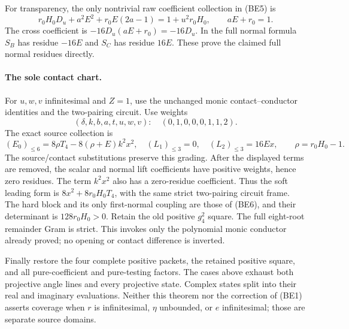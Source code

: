 For transparency, the only nontrivial raw coefficient collection in
(BE5) is
\[
 r_0H_0D_u+a^2E^2+r_0E(2a-1)=1+u^2r_0H_0,
 \qquad aE+r_0=1.
\]
The cross coefficient is $-16D_u(aE+r_0)=-16D_u$.
In the full normal formula $S_B$ has residue $-16E$ and $S_C$ has
residue $16E$. These prove the claimed full normal residues directly.

\paragraph{The sole contact chart.}
For $u,w,v$ infinitesimal and $Z=1$, use the unchanged monic
contact--conductor identities and the two-pairing circuit. Use weights
\[ (\delta,k,b,a,t,u,w,v):\quad(0,1,0,0,0,1,1,2). \]
The exact source collection is
\[
 (E_0)_{\le6}=8\rho T_4-8(\rho+E)k^2x^2,
 \quad (L_1)_{\le3}=0,\quad (L_2)_{\le3}=16Ex,
 \qquad \rho=r_0H_0-1.
\]
The source/contact substitutions preserve this grading. After the
displayed terms are removed, the scalar and normal lift coefficients
have positive weights, hence zero residues. The term $k^2x^2$ also
has a zero-residue coefficient. Thus the soft leading form is
$8x^2+8r_0H_0T_4$, with the same strict two-pairing circuit frame.
The hard block and its only first-normal coupling are those of (BE6),
and their determinant is $128r_0H_0>0$. Retain the old positive
$g_4^2$ square. The full eight-root remainder Gram is strict.
This invokes only the polynomial monic conductor already proved;
no opening or contact difference is inverted.

Finally restore the four complete positive packets, the retained
positive square, and all pure-coefficient and pure-testing factors.
The cases above exhaust both projective angle lines and every
projective state. Complex states split into their real and imaginary
evaluations. Neither this theorem nor the correction of (BE1) asserts
coverage when $r$ is infinitesimal, $\eta$ unbounded, or $e$
infinitesimal; those are separate source domains.
